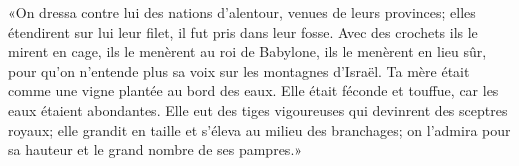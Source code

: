 «On dressa contre lui des nations d’alentour, venues de leurs provinces;
	elles étendirent sur lui leur filet, il fut pris dans leur fosse.
Avec des crochets ils le mirent en cage,
	ils le menèrent au roi de Babylone, ils le menèrent en lieu sûr,
	pour qu’on n’entende plus sa voix sur les montagnes d’Israël.
Ta mère était comme une vigne plantée au bord des eaux.
	Elle était féconde et touffue, car les eaux étaient abondantes.
Elle eut des tiges vigoureuses qui devinrent des sceptres royaux;
	elle grandit en taille et s’éleva au milieu des branchages;
	on l’admira pour sa hauteur et le grand nombre de ses pampres.»
